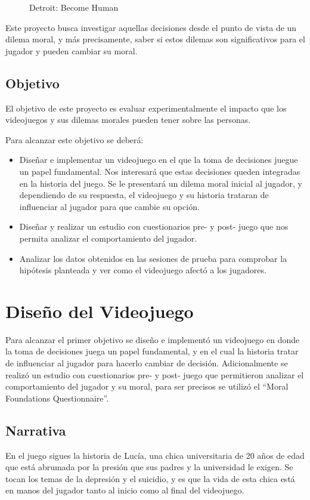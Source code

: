 \documentclass[12pt]{article}
\begin{document}
\begin{figure}[h]
\begin{minipage}{.69\textwidth}
        \caption*{Detroit: Become Human}
    \end{minipage}
\end{figure}

Este proyecto busca investigar aquellas decisiones desde el punto de vista de un dilema moral, y más precisamente, saber si estos dilemas son significativos para el jugador y pueden cambiar su moral.

\subsection{Objetivo}
El objetivo de este proyecto es evaluar experimentalmente el impacto que los videojuegos y sus dilemas morales pueden tener sobre las personas.

Para alcanzar este objetivo se deberá:
\begin{itemize}
    \item Diseñar e implementar un videojuego en el que la toma de decisiones juegue un papel fundamental. Nos interesará que estas decisiones queden integradas en la historia del juego. Se le presentará un dilema moral inicial al jugador, y dependiendo de su respuesta, el videojuego y su historia trataran de influenciar al jugador para que cambie su opción.
    \item Diseñar y realizar un estudio con cuestionarios pre- y post- juego que nos permita analizar el comportamiento del jugador.
    \item Analizar los datos obtenidos en las sesiones de prueba para comprobar la hipótesis planteada y ver como el videojuego afectó a los jugadores.
\end{itemize}

\section{Diseño del Videojuego}
Para alcanzar el primer objetivo se diseño e implementó un videojuego en donde la toma de decisiones juega un papel fundamental, y en el cual la historia tratar de influenciar al jugador para hacerlo cambiar de decisión. Adicionalmente se realizó un estudio con cuestionarios pre- y post- juego que permitieron analizar el comportamiento del jugador y su moral, para ser precisos se utilizó el “Moral Foundations Questionnaire”.

\subsection{Narrativa}
En el juego sigues la historia de Lucía, una chica universitaria de 20 años de edad que está abrumada por la presión que sus padres y la universidad le exigen. Se tocan los temas de la depresión y el suicidio, y es que la vida de esta chica está en manos del jugador tanto al inicio como al final del videojuego.
\end{document}
